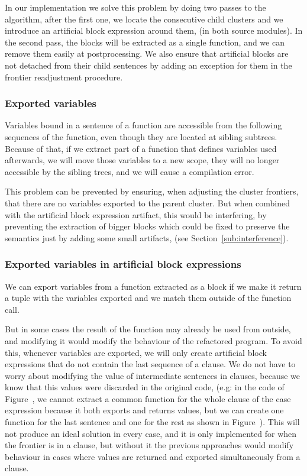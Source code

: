 In our implementation we solve this problem by doing two passes to
the algorithm, after the first one, we locate the consecutive child
clusters and we introduce an artificial block expression around them,
(in both source modules). In the second pass, the blocks will be extracted
as a single function, and we can remove them easily at postprocessing.
We also ensure that artificial blocks are not detached from their
child sentences by adding an exception for them in the frontier readjustment
procedure.


\subsubsection{Exported variables}

Variables bound in a sentence of a function are accessible from the
following sequences of the function, even though they are located
at sibling subtrees. Because of that, if we extract part of a function
that defines variables used afterwards, we will move those variables
to a new scope, they will no longer accessible by the sibling trees,
and we will cause a compilation error.

This problem can be prevented by ensuring, when adjusting the cluster
frontiers, that there are no variables exported to the parent cluster.
But when combined with the artificial block expression artifact, this
would be interfering, by preventing the extraction of bigger blocks
which could be fixed to preserve the semantics just by adding some
small artifacts, (see Section~\ref{sub:interference}).


\subsubsection{Exported variables in artificial block expressions\label{sub:interference}}

We can export variables from a function extracted as a block if we
make it return a tuple with the variables exported and we match them
outside of the function call.

But in some cases the result of the function may already be used from
outside, and modifying it would modify the behaviour of the refactored
program. To avoid this, whenever variables are exported, we will only
create artificial block expressions that do not contain the last sequence
of a clause. We do not have to worry about modifying the value of
intermediate sentences in clauses, because we know that this values
were discarded in the original code, (e.g: in the code of Figure~,
we cannot extract a common function for the whole clause of the case
expression because it both exports and returns values, but we can
create one function for the last sentence and one for the rest as
shown in Figure~). This will not produce an ideal solution in every
case, and it is only implemented for when the frontier is in a clause,
but without it the previous approaches would modify behaviour in cases
where values are returned and exported simultaneously from a clause.

